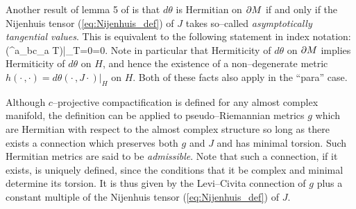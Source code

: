 Another result of lemma 5 of \cite{CG} is that $d\theta$ is Hermitian on $\partial M$ if and only if the Nijenhuis tensor (\ref{eq:Nijenhuis_def}) of $J$ takes so--called \textit{asymptotically tangential values}. This is equivalent to the following statement in index notation:
\be
\label{Nijenhuis_condition}
\Big({^{a}}_{bc}\nabla_a T\Big)\Big|_{T=0}=0.  \ee
Note in particular that Hermiticity of $d\theta$ on $\partial M$ implies Hermiticity of $d\theta$ on $ H $, and hence the existence of a non--degenerate metric $h(\cdot\,,\cdot)=d\theta(\cdot\,,J\cdot)|_ H $ on $ H $. Both of these facts also apply in the ``para'' case.


Although $c$--projective compactification is defined for any almost complex manifold, the definition can be applied to pseudo--Riemannian metrics $g$ which are Hermitian with respect to the almost complex structure so long as there exists a connection which preserves both $g$ and $J$ and has minimal torsion. Such Hermitian metrics are said to be \textit{admissible}.  Note that such a connection, if it exists, is uniquely defined, since the conditions that it be complex and minimal determine its torsion. It is thus given by the Levi--Civita connection of $g$ plus a constant multiple of the Nijenhuis tensor (\ref{eq:Nijenhuis_def}) of $J$.

